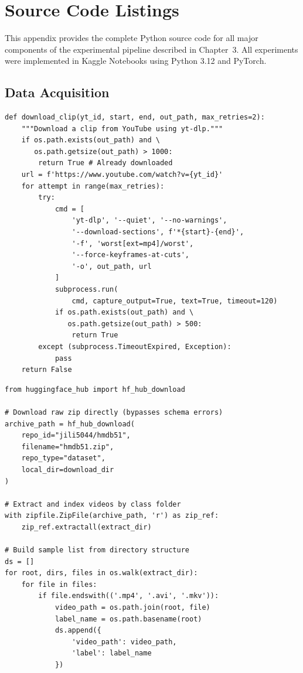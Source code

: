 \chapter{Source Code Listings}
\label{app:source_code}

This appendix provides the complete Python source code for all major components of the experimental pipeline described in Chapter~3. All experiments were implemented in Kaggle Notebooks using Python 3.12 and PyTorch.

\section{Data Acquisition}

\begin{lstlisting}[caption={FineGym clip download with \texttt{yt-dlp} temporal trimming.}, label={lst:fg_download}]
def download_clip(yt_id, start, end, out_path, max_retries=2):
    """Download a clip from YouTube using yt-dlp."""
    if os.path.exists(out_path) and \
       os.path.getsize(out_path) > 1000:
        return True # Already downloaded
    url = f'https://www.youtube.com/watch?v={yt_id}'
    for attempt in range(max_retries):
        try:
            cmd = [
                'yt-dlp', '--quiet', '--no-warnings',
                '--download-sections', f'*{start}-{end}',
                '-f', 'worst[ext=mp4]/worst',
                '--force-keyframes-at-cuts',
                '-o', out_path, url
            ]
            subprocess.run(
                cmd, capture_output=True, text=True, timeout=120)
            if os.path.exists(out_path) and \
               os.path.getsize(out_path) > 500:
                return True
        except (subprocess.TimeoutExpired, Exception):
            pass
    return False
\end{lstlisting}

\begin{lstlisting}[caption={HMDB51 download and local indexing pipeline.}, label={lst:hmdb_download}]
from huggingface_hub import hf_hub_download

# Download raw zip directly (bypasses schema errors)
archive_path = hf_hub_download(
    repo_id="jili5044/hmdb51",
    filename="hmdb51.zip",
    repo_type="dataset",
    local_dir=download_dir
)

# Extract and index videos by class folder
with zipfile.ZipFile(archive_path, 'r') as zip_ref:
    zip_ref.extractall(extract_dir)

# Build sample list from directory structure
ds = []
for root, dirs, files in os.walk(extract_dir):
    for file in files:
        if file.endswith(('.mp4', '.avi', '.mkv')):
            video_path = os.path.join(root, file)
            label_name = os.path.basename(root)
            ds.append({
                'video_path': video_path,
                'label': label_name
            })
\end{lstlisting}

